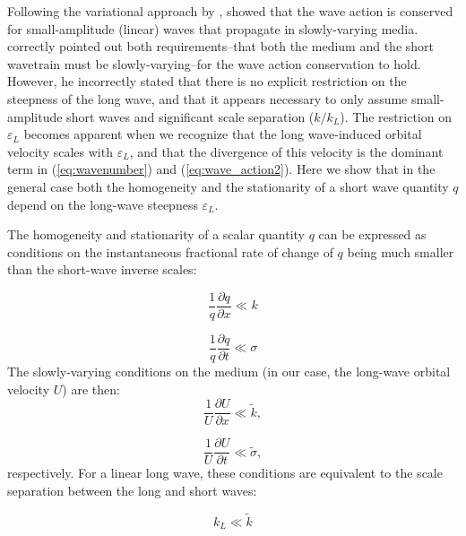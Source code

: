 \documentclass[lineno]{jfm}
\begin{document}
Following the variational approach by \citet{whitham1965general},
\citet{bretherton1968wavetrains} showed that the wave action is conserved for
small-amplitude (linear) waves that propagate in slowly-varying media.
\citet{longuet1987propagation} correctly pointed out both
requirements--that both the medium and the short wavetrain must be
slowly-varying--for the wave action conservation to hold.
However, he incorrectly stated that there is no explicit restriction on the
steepness of the long wave, and that it appears necessary to only assume
small-amplitude short waves and significant scale separation ($k/k_L$).
The restriction on $\varepsilon_L$ becomes apparent when we recognize
that the long wave-induced orbital velocity scales with $\varepsilon_L$, and
that the divergence of this velocity is the dominant term in (\ref{eq:wavenumber})
and (\ref{eq:wave_action2}).
Here we show that in the general case both the homogeneity and the stationarity
of a short wave quantity $q$ depend on the long-wave steepness $\varepsilon_L$.

The homogeneity and stationarity of a scalar quantity $q$ can be expressed as
conditions on the instantaneous fractional rate of change of $q$ being much
smaller than the short-wave inverse scales:

\begin{equation}
  \frac{1}{q} \frac{\partial q}{\partial x} \ll k
  \label{eq:homogeneity_condition}
\end{equation}

\begin{equation}
  \frac{1}{q} \frac{\partial q}{\partial t} \ll \sigma
  \label{eq:stationarity_condition}
\end{equation}
The slowly-varying conditions on the medium (in our case, the long-wave orbital
velocity $U$) are then:
\begin{equation}
  \frac{1}{U} \frac{\partial U}{\partial x} \ll \widetilde{k},
\end{equation}

\begin{equation}
  \frac{1}{U} \frac{\partial U}{\partial t} \ll \widetilde{\sigma},
\end{equation}
respectively.
For a linear long wave, these conditions are equivalent to the scale separation
between the long and short waves:

\begin{equation}
  k_L \ll \widetilde{k}
  \label{eq:k_scale_separation}
\end{equation}
\end{document}
